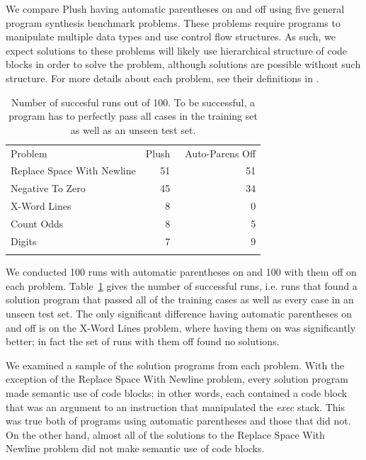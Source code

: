 \documentclass[graybox]{svmult}
\begin{document}
We compare Plush having automatic parentheses on and off using five general program synthesis benchmark problems. These problems require programs to manipulate multiple data types and use control flow structures. As such, we expect solutions to these problems will likely use hierarchical structure of code blocks in order to solve the problem, although solutions are possible without such structure. For more details about each problem, see their definitions in \cite{Helmuth:2015:GECCO}.

\begin{table}[t]
\centering
\caption{
Number of succesful runs out of 100. To be successful, a program has to perfectly pass all cases in the training set as well as an unseen test set.
}
\label{no-auto-parens-experiment}       %
%
%
\begin{tabular}{l r r}
\hline\noalign{\smallskip}
Problem                    & Plush & ~Auto-Parens Off \\
\noalign{\smallskip}\svhline\noalign{\smallskip}
Replace Space With Newline &  51 & 51 \\
Negative To Zero           &  45 & 34 \\
X-Word Lines               &   8 &  0 \\
Count Odds                 &   8 &  5 \\
Digits                     &   7 &  9 \\
\noalign{\smallskip}\hline\noalign{\smallskip}
\end{tabular}
\end{table}

We conducted 100 runs with automatic parentheses on and 100 with them off on each problem. Table~\ref{no-auto-parens-experiment} gives the number of successful runs, i.e. runs that found a solution program that passed all of the training cases as well as every case in an unseen test set. The only significant difference having automatic parentheses on and off is on the X-Word Lines problem, where having them on was significantly better; in fact the set of runs with them off found no solutions.

We examined a sample of the solution programs from each problem. With the exception of the Replace Space With Newline problem, every solution program made semantic use of code blocks; in other words, each contained a code block that was an argument to an instruction that manipulated the \textit{exec} stack. This was true both of programs using automatic parentheses and those that did not. On the other hand, almost all of the solutions to the Replace Space With Newline problem did not make semantic use of code blocks.
\end{document}
